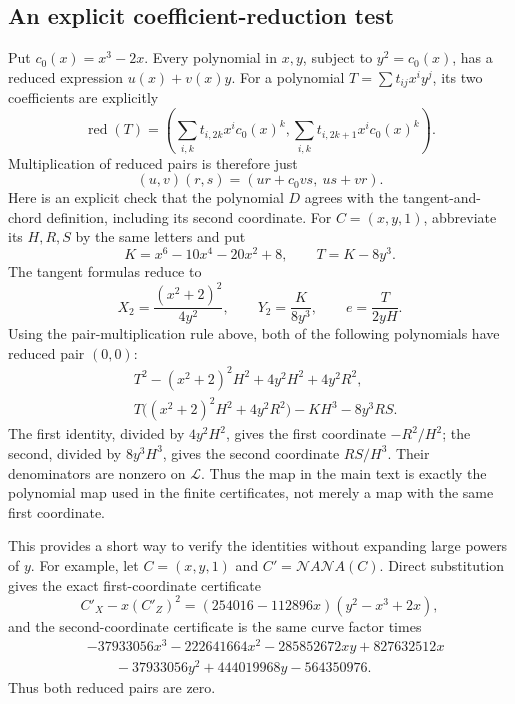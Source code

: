 \documentclass[11pt,a4paper]{article}
\theoremstyle{definition}
\newcommand{\NN}{\mathcal N}
\newcommand{\red}{\operatorname{red}}
\begin{document}
\subsection{An explicit coefficient-reduction test}

Put \(c_0(x)=x^3-2x\). Every polynomial in \(x,y\), subject to
\(y^2=c_0(x)\), has a reduced expression \(u(x)+v(x)y\).
For a polynomial \(T=\sum t_{ij}x^iy^j\), its two coefficients
are explicitly
\begin{equation}\label{eq:reduction}
 \red(T)=\left(
 \sum_{i,k}t_{i,2k}x^ic_0(x)^k,
 \sum_{i,k}t_{i,2k+1}x^ic_0(x)^k\right).
\end{equation}
Multiplication of reduced pairs is therefore just
\[
 (u,v)(r,s)=(ur+c_0vs,\ us+vr).
\]
Here is an explicit check that the polynomial \(D\) agrees with
the tangent-and-chord definition, including its second coordinate.
For \(C=(x,y,1)\), abbreviate its \(H,R,S\) by the same letters
and put
\[
 K=x^6-10x^4-20x^2+8,\qquad T=K-8y^3.
\]
The tangent formulas reduce to
\[
 X_2=\frac{(x^2+2)^2}{4y^2},\qquad
 Y_2=\frac{K}{8y^3},\qquad
 e=\frac{T}{2yH}.
\]
Using the pair-multiplication rule above, both of the following
polynomials have reduced pair \((0,0)\):
\begin{align*}
 &T^2-(x^2+2)^2H^2+4y^2H^2+4y^2R^2,\\
 &T\bigl((x^2+2)^2H^2+4y^2R^2\bigr)-KH^3-8y^3RS.
\end{align*}
The first identity, divided by \(4y^2H^2\), gives the first
coordinate \(-R^2/H^2\); the second, divided by \(8y^3H^3\),
gives the second coordinate \(RS/H^3\). Their denominators are
nonzero on \(\mathcal L\). Thus the map in the main text is exactly
the polynomial map used in the finite certificates, not merely a map
with the same first coordinate.

This provides a short way to verify the identities without expanding
large powers of \(y\). For example, let \(C=(x,y,1)\) and
\(C'=\NN A\NN A(C)\). Direct substitution gives the exact
first-coordinate certificate
\[
 C'_X-x(C'_Z)^2=(254016-112896x)(y^2-x^3+2x),
\]
and the second-coordinate certificate is the same curve factor times
\begin{align*}
 &-37933056x^3-222641664x^2-285852672xy+827632512x\\
 &\qquad-37933056y^2+444019968y-564350976.
\end{align*}
Thus both reduced pairs are zero.
\end{document}
